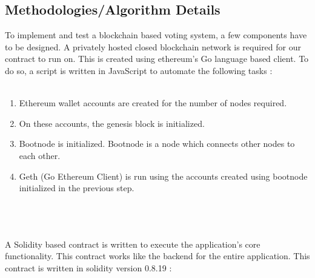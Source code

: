 \documentclass[oneside, 12pt]{book}
\begin{document}
		\subsection{Methodologies/Algorithm Details}
			To implement and test a blockchain based voting system, a few components have to be designed. A privately hosted closed blockchain network is required for our contract to run on. This is created using ethereum’s Go language based client. To do so, a script is written in JavaScript to automate the following tasks :
			\\\\\colorbox{gray!20}{%
		        \begin{minipage}{\linewidth}%
		            \vspace*{2pt}
		            	\begin{enumerate}
		            		\item Ethereum wallet accounts are created for the number of nodes required.
		            		\item On these accounts, the genesis block is initialized.
		            		\item Bootnode is initialized. Bootnode is a node which connects other nodes to each other.
		            		\item Geth (Go Ethereum Client) is run using the accounts created using bootnode initialized in the previous step.
		            	\end{enumerate}
		            \vspace*{2pt}
		        \end{minipage}%
		    }
			\\\\\\A Solidity based contract is written to execute the application’s core functionality. This contract works like the backend for the entire application. This contract is written in solidity version 0.8.19 :
\end{document}
